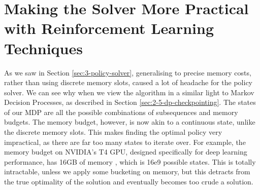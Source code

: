 \section{Making the Solver More Practical with Reinforcement Learning Techniques}

As we saw in Section \ref{sec:3-policy-solver}, generalising to precise memory costs, rather than using discrete memory slots, caused a lot of headache for the policy solver.
We can see why when we view the algorithm in a similar light to Markov Decision Processes, as described in Section \ref{sec:2-5-dp-checkpointing}.
The states of our MDP are all the possible combinations of subsequences and memory budgets.
The memory budget, however, is now akin to a continuous state, unlike the discrete memory slots.
This makes finding the optimal policy very impractical, as there are far too many states to iterate over.
For example, the memory budget on NVIDIA's T4 GPU, designed specifically for deep learning performance, has 16GB of memory \cite{Nvidia2019-T4}, which is 16e9 possible states.
This is totally intractable, unless we apply some bucketing on memory, but this detracts from the true optimality of the solution and eventually becomes too crude a solution.


